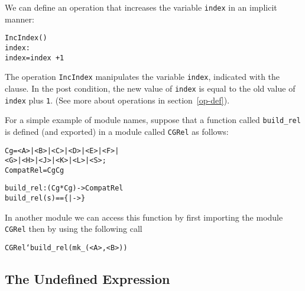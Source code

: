 \documentclass[\pformat,12pt]{article}
\begin{document}
\begin{description}
  We can define an operation that increases the variable {\tt index} in
  an implicit manner:
  \begin{alltt}
    IncIndex()
     index : 
     index = index~ + 1
  \end{alltt}
  The operation {\tt IncIndex} manipulates the variable {\tt index},
  indicated with the  clause. In the post condition, the new
  value of {\tt index} is equal to the old value of {\tt index} plus
  \texttt{1}. (See more about operations in section~\ref{op-def}).

  For a simple example of 
module 
  names, suppose that a function called 
  \texttt{build\_rel} is defined (and exported) in a 
module 
  called 
  \texttt{CGRel} as follows:
\begin{alltt}

    Cg = <A> | <B> | <C> | <D> | <E> | <F> | 
         <G> | <H> | <J> | <K> | <L> | <S>;
    CompatRel =  Cg  Cg


    build_rel :  (Cg * Cg) -> CompatRel
    build_rel (s) == \{|->\}
\end{alltt}
In another 
module 
  we can access this function by 
first importing the module \texttt{CGRel} then by 
  using the following call 
  \begin{alltt}
  CGRel`build_rel({mk_(<A>, <B>)})
  \end{alltt}


\end{description}

\subsection{The Undefined Expression}
\end{document}
